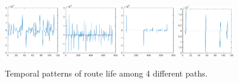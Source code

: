 \documentclass[sigconf]{acmart}
\begin{document}
	\begin{figure} 	
		\includegraphics[width=0.22\textwidth]{fig/total_life_8} 
		\label{fig:3.1a}
		\includegraphics[width=0.22\textwidth]{fig/total_life_20}
		\label{fig:3.1b}
		\includegraphics[width=0.22\textwidth]{fig/total_life_21}
		\label{fig:3.1c}
		\includegraphics[width=0.22\textwidth]{fig/total_life_30}
		\label{fig:3.1d}

		\caption{Temporal patterns of route life among 4 different paths.}
		\label{fig:3.1}  
	\end{figure}
\end{document}
